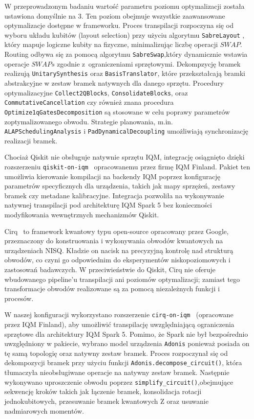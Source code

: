 W przeprowadzonym badaniu wartość parametru poziomu optymalizacji została ustawiona domyślnie na 3. Ten poziom obejmuje wszystkie zaawansowane optymalizacje dostępne w frameworku. Proces transpilacji rozpoczyna się od wyboru układu kubitów (layout selection) przy użyciu algorytmu \texttt{SabreLayout} , który mapuje logiczne kubity na fizyczne, minimalizując liczbę operacji $\mathit{SWAP}$. Routing odbywa się za pomocą algorytmu  \texttt{SabreSwap},który dynamicznie wstawia operacje $\mathit{SWAPs}$ zgodnie z~ograniczeniami sprzętowymi. Dekompzycję bramek realizują \texttt{UnitarySynthesis} oraz \texttt{BasisTranslator}, które przekształcają bramki abstrakcyjne w zestaw bramek natywnych dla danego sprzętu. Procedury optymalizacyjne \texttt{Collect2QBlocks}, \texttt{ConsolidateBlocks}, oraz \texttt{Commutative\-Cancellation} czy również znana procedura \texttt{Optimize1qGatesDecomposi\-tion} są stosowane w celu poprawy parametrów zoptymalizowanego obwodu. Strategie planowania, m.in.  \texttt{ALAPSchedulingAnalysis} i \texttt{PadDy\-namicalDecoupling} umożliwiają synchronizację realizacji bramek.

Chociaż Qiskit nie obsługuje natywnie sprzętu IQM, integrację osiągnięto dzięki rozszerzeniu \texttt{qiskit-on-iqm~\cite{qiskitoniqm2024}} opracowanemu przez firmę IQM Finland. Pakiet ten umożliwia kierowanie kompilacji na backendy IQM poprzez konfigurację parametrów specyficznych dla urządzenia, takich jak mapy sprzężeń, zestawy bramek czy metadane kalibracyjne. Integracja pozwoliła na wykonywanie natywnej transpilacji pod architekturę IQM Spark 5 bez konieczności modyfikowania wewnętrznych mechanizmów Qiskit.


Cirq~\cite{cirq2024} to framework kwantowy typu open-source opracowany przez Google, przeznaczony do konstruowania i wykonywania obwodów kwantowych na urządzeniach NISQ. Kładzie on nacisk na precyzyjną kontrolę nad strukturą obwodów, co czyni go odpowiednim do eksperymentów niskopoziomowych i zastosowań badawczych. W przeciwieństwie do Qiskit, Cirq nie oferuje wbudowanego pipeline’u transpilacji ani poziomów optymalizacji; zamiast tego transformacje obwodów realizowane są za pomocą niezależnych funkcji i procesów. 

W naszej konfiguracji wykorzystano rozszerzenie \texttt{cirq-on-iqm~\cite{cirqoniqm2024}} (opracowane przez IQM Finland), aby umożliwić transpilację uwzględniającą ograniczenia sprzętowe dla architektury IQM Spark 5. Pomimo, że Spark nie był bezpośrednio uwzględniony w pakiecie, wybrano model urządzenia \texttt{Adonis} ponieważ posiada on tę samą topologię oraz natywny zestaw bramek. Proces rozpoczynał się od dekompozycji bramek przy użyciu funkcji \texttt{Adonis.decompose\_circuit()}, która tłumaczyła nieobsługiwane operacje na natywny zestaw bramek. Następnie wykonywano uproszczenie obwodu poprzez \texttt{simplify\_circuit()},obejmujące sekwencję kroków takich jak łączenie bramek, konsolidacja rotacji jednokubitowych, przesuwanie bramek kwantowych Z oraz usuwanie nadmiarowych momentów.

